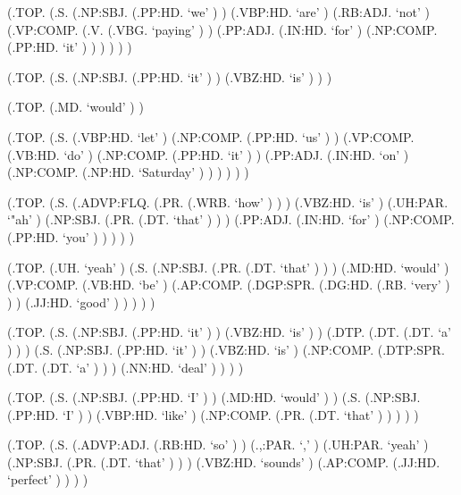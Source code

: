 \documentclass[10pt]{article}
\begin{document}
\begin{parsetree}  (.TOP. (.S. (.NP:SBJ. (.PP:HD. `we' ) ) (.VBP:HD. `are' ) (.RB:ADJ. `not' ) (.VP:COMP. (.V. (.VBG. `paying' ) ) (.PP:ADJ. (.IN:HD. `for' ) (.NP:COMP. (.PP:HD. `it' ) ) ) ) ) ) \end{parsetree}

\begin{parsetree}  (.TOP. (.S. (.NP:SBJ. (.PP:HD. `it' ) ) (.VBZ:HD. `is' ) ) ) \end{parsetree}

\begin{parsetree}  (.TOP. (.MD. `would' ) ) \end{parsetree}

\begin{parsetree}  (.TOP. (.S. (.VBP:HD. `let' ) (.NP:COMP. (.PP:HD. `us' ) ) (.VP:COMP. (.VB:HD. `do' ) (.NP:COMP. (.PP:HD. `it' ) ) (.PP:ADJ. (.IN:HD. `on' ) (.NP:COMP. (.NP:HD. `Saturday' ) ) ) ) ) ) \end{parsetree}

\begin{parsetree}  (.TOP. (.S. (.ADVP:FLQ. (.PR. (.WRB. `how' ) ) ) (.VBZ:HD. `is' ) (.UH:PAR. `"ah' ) (.NP:SBJ. (.PR. (.DT. `that' ) ) ) (.PP:ADJ. (.IN:HD. `for' ) (.NP:COMP. (.PP:HD. `you' ) ) ) ) ) \end{parsetree}

\begin{parsetree}  (.TOP. (.UH. `yeah' ) (.S. (.NP:SBJ. (.PR. (.DT. `that' ) ) ) (.MD:HD. `would' ) (.VP:COMP. (.VB:HD. `be' ) (.AP:COMP. (.DGP:SPR. (.DG:HD. (.RB. `very' ) ) ) (.JJ:HD. `good' ) ) ) ) ) \end{parsetree}

\begin{parsetree}  (.TOP. (.S. (.NP:SBJ. (.PP:HD. `it' ) ) (.VBZ:HD. `is' ) ) (.DTP. (.DT. (.DT. `a' ) ) ) (.S. (.NP:SBJ. (.PP:HD. `it' ) ) (.VBZ:HD. `is' ) (.NP:COMP. (.DTP:SPR. (.DT. (.DT. `a' ) ) ) (.NN:HD. `deal' ) ) ) ) \end{parsetree}

\begin{parsetree}  (.TOP. (.S. (.NP:SBJ. (.PP:HD. `I' ) ) (.MD:HD. `would' ) ) (.S. (.NP:SBJ. (.PP:HD. `I' ) ) (.VBP:HD. `like' ) (.NP:COMP. (.PR. (.DT. `that' ) ) ) ) ) \end{parsetree}

\begin{parsetree}  (.TOP. (.S. (.ADVP:ADJ. (.RB:HD. `so' ) ) (.,:PAR. `,' ) (.UH:PAR. `yeah' ) (.NP:SBJ. (.PR. (.DT. `that' ) ) ) (.VBZ:HD. `sounds' ) (.AP:COMP. (.JJ:HD. `perfect' ) ) ) ) \end{parsetree}
\end{document}
